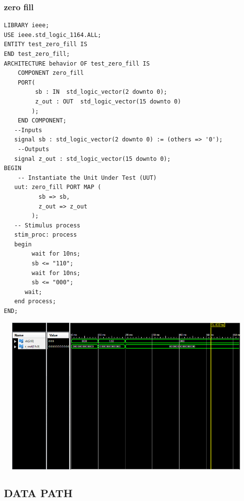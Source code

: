 \documentclass{article}
\begin{document}
\subsubsection{zero fill}\label{sec:intro}
\begin{lstlisting}
LIBRARY ieee;
USE ieee.std_logic_1164.ALL;
ENTITY test_zero_fill IS
END test_zero_fill; 
ARCHITECTURE behavior OF test_zero_fill IS 
    COMPONENT zero_fill
    PORT(
         sb : IN  std_logic_vector(2 downto 0);
         z_out : OUT  std_logic_vector(15 downto 0)
        );
    END COMPONENT;    
   --Inputs
   signal sb : std_logic_vector(2 downto 0) := (others => '0');
 	--Outputs
   signal z_out : std_logic_vector(15 downto 0);
BEGIN 
	-- Instantiate the Unit Under Test (UUT)
   uut: zero_fill PORT MAP (
          sb => sb,
          z_out => z_out
        );
   -- Stimulus process
   stim_proc: process
   begin		
		wait for 10ns;
		sb <= "110";
		wait for 10ns;
		sb <= "000";
      wait;
   end process;
END;   
\end{lstlisting}
\includegraphics[width=16cm, height=8cm]{test_zero_fill.png}
\pagebreak



\subsection{DATA PATH}\label{sec:result}
\end{document}
